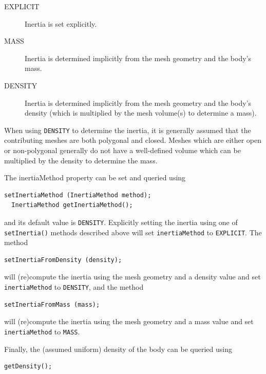 \begin{description}

\item[EXPLICIT]\mbox{}

Inertia is set explicitly.

\item[MASS]\mbox{}

Inertia is determined implicitly from the mesh geometry and the body's
mass.

\item[DENSITY]\mbox{}

Inertia is determined implicitly from the mesh geometry and the body's
density (which is multiplied by the mesh volume(s) to determine a
mass).

\end{description}

\begin{sideblock}
When using {\tt DENSITY} to determine the inertia, it is generally
assumed that the contributing meshes are both polygonal and
closed. Meshes which are either open or non-polygonal generally do not
have a well-defined volume which can be multiplied by the density to
determine the mass.
\end{sideblock}

The {\sf inertiaMethod} property can be set and queried using
\begin{lstlisting}[]
  setInertiaMethod (InertiaMethod method);
  InertiaMethod getInertiaMethod();
\end{lstlisting}
%
and its default value is {\tt DENSITY}. Explicitly setting the
inertia using one of {\tt setInertia()} methods described above will
set {\tt inertiaMethod} to {\tt EXPLICIT}. The method
\begin{lstlisting}[]
  setInertiaFromDensity (density); 
\end{lstlisting}
%
will (re)compute the inertia using the mesh geometry and a density value
and set {\tt inertiaMethod} to {\tt DENSITY}, and
the method
\begin{lstlisting}[]
  setInertiaFromMass (mass); 
\end{lstlisting}
%
will (re)compute the inertia using the mesh geometry and a mass value
and set {\tt inertiaMethod} to {\tt MASS}.

Finally, the (assumed uniform) density of the body can be queried
using
\begin{lstlisting}[]
   getDensity();
\end{lstlisting}
%

